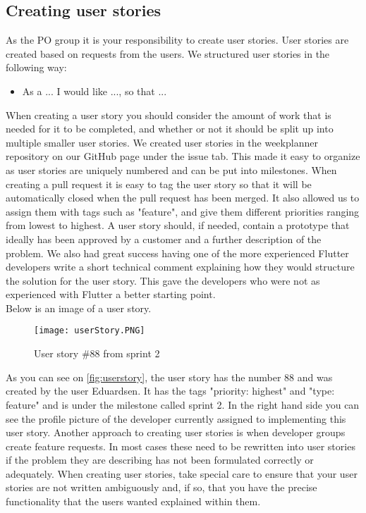 \subsection{Creating user stories}
As the PO group it is your responsibility to create user stories.
User stories are created based on requests from the users.
We structured user stories in the following way:
\begin{itemize}
    \item As a ... I would like ..., so that ...
\end{itemize}

When creating a user story you should consider the amount of work that is needed for it to be completed, and whether or not it should be split up into multiple smaller user stories.
We created user stories in the weekplanner repository on our GitHub page under the issue tab.
This made it easy to organize as user stories are uniquely numbered and can be put into milestones.
When creating a pull request it is easy to tag the user story so that it will be automatically closed when the pull request has been merged.
It also allowed us to assign them with tags such as "feature", and give them different priorities ranging from lowest to highest.
A user story should, if needed, contain a prototype that ideally has been approved by a customer and a further description of the problem.
We also had great success having one of the more experienced Flutter developers write a short technical comment explaining how they would structure the solution for the user story.
This gave the developers who were not as experienced with Flutter a better starting point.
\\
Below is an image of a user story.
\begin{figure}[h]
    \centering
    \texttt{[image: userStory.PNG]}
    \caption{User story \#88 from sprint 2}
    \label{fig:userstory}
\end{figure}
As you can see on \autoref{fig:userstory}, the user story has the number 88 and was created by the user Eduardsen.
It has the tags "priority: highest" and "type: feature" and is under the milestone called sprint 2.
In the right hand side you can see the profile picture of the developer currently assigned to implementing this user story.
Another approach to creating user stories is when developer groups create feature requests.
In most cases these need to be rewritten into user stories if the problem they are describing has not been formulated correctly or adequately.
When creating user stories, take special care to ensure that your user stories are not written ambiguously and, if so, that you have the precise functionality that the users wanted explained within them.

